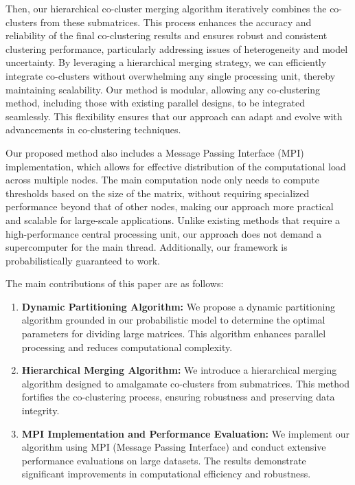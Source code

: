 \documentclass[journal]{IEEEtran}
\begin{document}
Then, our hierarchical co-cluster merging algorithm iteratively combines the co-clusters from these submatrices. This process enhances the accuracy and reliability of the final co-clustering results and ensures robust and consistent clustering performance, particularly addressing issues of heterogeneity and model uncertainty. By leveraging a hierarchical merging strategy, we can efficiently integrate co-clusters without overwhelming any single processing unit, thereby maintaining scalability. Our method is modular, allowing any co-clustering method, including those with existing parallel designs, to be integrated seamlessly. This flexibility ensures that our approach can adapt and evolve with advancements in co-clustering techniques.

Our proposed method also includes a Message Passing Interface (MPI) implementation, which allows for effective distribution of the computational load across multiple nodes. The main computation node only needs to compute thresholds based on the size of the matrix, without requiring specialized performance beyond that of other nodes, making our approach more practical and scalable for large-scale applications. Unlike existing methods that require a high-performance central processing unit, our approach does not demand a supercomputer for the main thread. Additionally, our framework is probabilistically guaranteed to work.

The main contributions of this paper are as follows:
\begin{enumerate}
  \item \textbf{Dynamic Partitioning Algorithm:}
        We propose a dynamic partitioning algorithm grounded in our probabilistic model to determine the optimal parameters for dividing large matrices. This algorithm enhances parallel processing and reduces computational complexity.

  \item \textbf{Hierarchical Merging Algorithm:}
        We introduce a hierarchical merging algorithm designed to amalgamate co-clusters from submatrices. This method fortifies the co-clustering process, ensuring robustness and preserving data integrity.

  \item \textbf{MPI Implementation and Performance Evaluation:}
        We implement our algorithm using MPI (Message Passing Interface) and conduct extensive performance evaluations on large datasets. The results demonstrate significant improvements in computational efficiency and robustness.

\end{enumerate}
\end{document}

